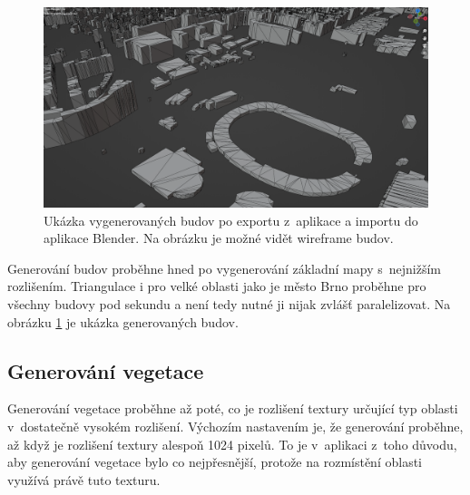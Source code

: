 \begin{figure}[H]
	\centering
	\includegraphics[width=32em]{images/impl/buildings.png}
	\caption[caption]{Ukázka vygenerovaných budov po exportu z~aplikace a importu do aplikace Blender. Na obrázku je možné vidět wireframe budov.} 
	\label{buildings-gen}
\end{figure}

Generování budov proběhne hned po vygenerování základní mapy s~nejnižším rozlišením. Triangulace i pro velké oblasti jako je město Brno proběhne pro všechny budovy pod sekundu a není tedy nutné ji nijak zvlášť paralelizovat. Na obrázku \ref{buildings-gen} je ukázka generovaných budov.

\subsection*{Generování vegetace}
Generování vegetace proběhne až poté, co je rozlišení textury určující typ oblasti v~dostatečně vysokém rozlišení. Výchozím nastavením je, že generování proběhne, až když je rozlišení textury alespoň 1024 pixelů. To je v~aplikaci z~toho důvodu, aby generování vegetace bylo co nejpřesnější, protože na rozmístění oblasti využívá právě tuto texturu. 

